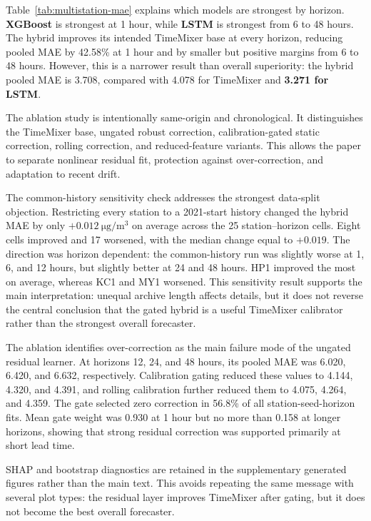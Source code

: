 \documentclass[sn-mathphys-num]{sn-jnl}
\begin{document}
Table~\ref{tab:multistation-mae} explains which models are strongest by
horizon. \textbf{XGBoost} is strongest at 1 hour, while \textbf{LSTM} is
strongest from 6 to 48 hours. The hybrid improves its intended TimeMixer base
at every horizon, reducing pooled MAE by 42.58\% at 1 hour and by smaller but
positive margins from 6 to 48 hours. However, this is a narrower result than
overall superiority: the hybrid pooled MAE is 3.708, compared with 4.078 for
TimeMixer and \textbf{3.271 for LSTM}.

The ablation study is intentionally same-origin and chronological. It
distinguishes the TimeMixer base, ungated robust correction,
calibration-gated static correction, rolling correction, and reduced-feature
variants. This allows the paper to separate nonlinear residual fit, protection
against over-correction, and adaptation to recent drift.

The common-history sensitivity check addresses the strongest data-split
objection. Restricting every station to a 2021-start history changed the
hybrid MAE by only \(+0.012~\si{\micro\gram\per\cubic\metre}\) on average
across the 25 station--horizon cells. Eight cells improved and 17 worsened,
with the median change equal to \(+0.019\). The direction was horizon
dependent: the common-history run was slightly worse at 1, 6, and 12 hours,
but slightly better at 24 and 48 hours. HP1 improved the most on average,
whereas KC1 and MY1 worsened. This sensitivity result supports the main
interpretation: unequal archive length affects details, but it does not
reverse the central conclusion that the gated hybrid is a useful TimeMixer
calibrator rather than the strongest overall forecaster.

The ablation identifies over-correction as the main failure mode of the
ungated residual learner. At horizons 12, 24, and 48 hours, its pooled MAE was
6.020, 6.420, and 6.632, respectively. Calibration gating reduced these values
to 4.144, 4.320, and 4.391, and rolling calibration further reduced them to
4.075, 4.264, and 4.359. The gate selected zero correction in 56.8\% of all
station-seed-horizon fits. Mean gate weight was 0.930 at 1 hour but no more
than 0.158 at longer horizons, showing that strong residual correction was
supported primarily at short lead time.

SHAP and bootstrap diagnostics are retained in the supplementary generated
figures rather than the main text. This avoids repeating the same message with
several plot types: the residual layer improves TimeMixer after gating, but it
does not become the best overall forecaster.
\FloatBarrier
\end{document}

